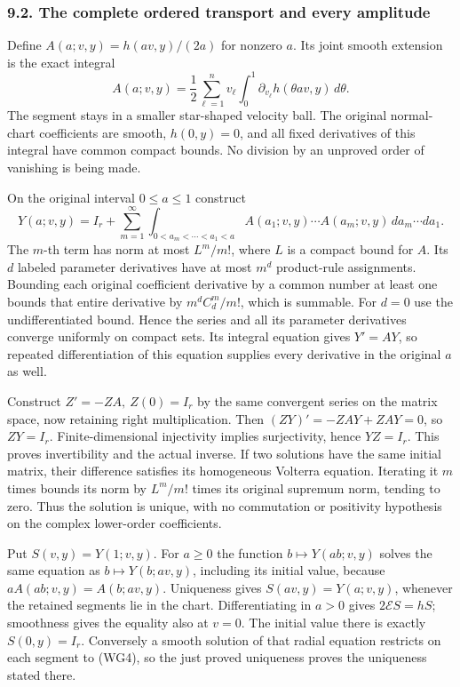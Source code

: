 \documentclass[
  11pt,
]{article}
\begin{document}
\subsubsection{9.2. The complete ordered transport and every
amplitude}\label{the-complete-ordered-transport-and-every-amplitude}

Define \(A(a;v,y)=h(av,y)/(2a)\) for nonzero \(a\). Its joint smooth
extension is the exact integral \[
 A(a;v,y)=\frac12\sum_{\ell=1}^n v_\ell
                  \int_0^1\partial_{v_\ell}h(\theta av,y)\,d\theta.
 \tag{WT4}
\] The segment stays in a smaller star-shaped velocity ball. The
original normal-chart coefficients are smooth, \(h(0,y)=0\), and all
fixed derivatives of this integral have common compact bounds. No
division by an unproved order of vanishing is being made.

On the original interval \(0\leq a\leq1\) construct \[
 Y(a;v,y)=I_r+
 \sum_{m=1}^\infty
 \int_{0<a_m<\cdots<a_1<a}
       A(a_1;v,y)\cdots A(a_m;v,y)\,da_m\cdots da_1.
 \tag{WT5}
\] The \(m\)-th term has norm at most \(L^m/m!\), where \(L\) is a
compact bound for \(A\). Its \(d\) labeled parameter derivatives have at
most \(m^d\) product-rule assignments. Bounding each original
coefficient derivative by a common number at least one bounds that
entire derivative by \(m^dC_d^m/m!\), which is summable. For \(d=0\) use
the undifferentiated bound. Hence the series and all its parameter
derivatives converge uniformly on compact sets. Its integral equation
gives \(Y'=AY\), so repeated differentiation of this equation supplies
every derivative in the original \(a\) as well.

Construct \(Z'=-ZA,\ Z(0)=I_r\) by the same convergent series on the
matrix space, now retaining right multiplication. Then
\((ZY)'=-ZAY+ZAY=0\), so \(ZY=I_r\). Finite-dimensional injectivity
implies surjectivity, hence \(YZ=I_r\). This proves invertibility and
the actual inverse. If two solutions have the same initial matrix, their
difference satisfies its homogeneous Volterra equation. Iterating it
\(m\) times bounds its norm by \(L^m/m!\) times its original supremum
norm, tending to zero. Thus the solution is unique, with no commutation
or positivity hypothesis on the complex lower-order coefficients.

Put \(S(v,y)=Y(1;v,y)\). For \(a\geq0\) the function
\(b\mapsto Y(ab;v,y)\) solves the same equation as
\(b\mapsto Y(b;av,y)\), including its initial value, because
\(aA(ab;v,y)=A(b;av,y)\). Uniqueness gives \(S(av,y)=Y(a;v,y)\),
whenever the retained segments lie in the chart. Differentiating in
\(a>0\) gives \(2\mathcal ES=hS\); smoothness gives the equality also at
\(v=0\). The initial value there is exactly \(S(0,y)=I_r\). Conversely a
smooth solution of that radial equation restricts on each segment to
(WG4), so the just proved uniqueness proves the uniqueness stated there.
\end{document}
